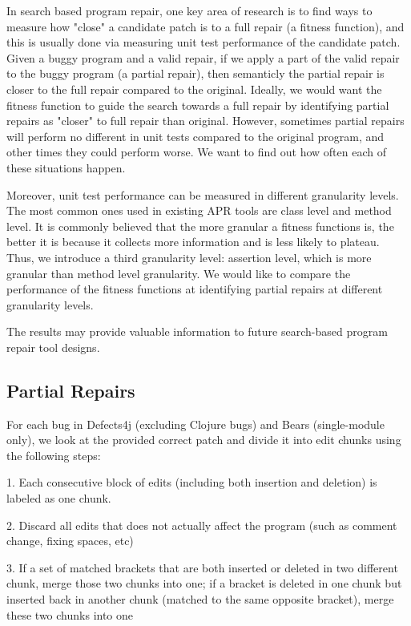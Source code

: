 \documentclass[sigconf, timestamp-false, anonymous=true]{acmart}
\begin{document}
In search based program repair, one key area of research is to find ways to measure how "close" a candidate patch is to a full repair (a fitness function),
and this is usually done via measuring unit test performance of the candidate patch. 
Given a buggy program and a valid repair, if we apply a part of the valid repair to the buggy program (a partial repair), then semanticly the partial repair is closer to the full repair compared to the original. 
Ideally, we would want the fitness function to guide the search towards a full repair by identifying partial repairs as "closer" to full repair than original.
However, sometimes partial repairs will perform no different in unit tests compared to the original program, and other times they could perform worse. We want to find out how often each of these situations happen.

Moreover, unit test performance can be measured in different granularity levels. The most common ones used in existing APR tools are class level and method level. 
It is commonly believed that the more granular a fitness functions is, the better it is because it collects more information and is less likely to plateau. Thus, we introduce a third granularity level: assertion level, which is more granular than method level granularity.
We would like to compare the performance of the fitness functions at identifying partial repairs at different granularity levels.

The results may provide valuable information to future search-based program repair tool designs.

\subsection{Partial Repairs}

For each bug in Defects4j (excluding Clojure bugs) and Bears (single-module only), we look at the provided correct patch and divide it into edit chunks using the following steps:

1. Each consecutive block of edits (including both insertion and deletion) is labeled as one chunk.

2. Discard all edits that does not actually affect the program (such as comment change, fixing spaces, etc)

3. If a set of matched brackets that are both inserted or deleted in two different chunk, merge those two chunks into one; if a bracket is deleted in one chunk but inserted back in another chunk (matched to the same opposite bracket), merge these two chunks into one
\end{document}
